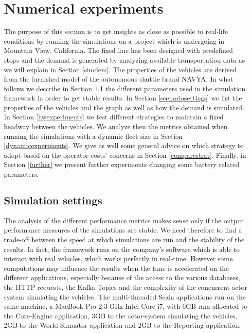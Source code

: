 \documentclass[12pt,a4paper]{article}
\begin{document}
\section{Numerical experiments}\label{experiments}
The purpose of this section is to get insights as close as possible to real-life conditions by running the simulations on a project which is undergoing in Mountain View, California. The fixed line has been designed with predefined stops and the demand is generated by analyzing available transportation data as we will explain in Section \ref{simdem}. The properties of the vehicles are derived from the furnished model of the autonomous shuttle brand NAVYA. In what follows we describe in Section \ref{settings} the different parameters used in the simulation framework in order to get stable results. In Section \ref{scenariosettings} we list the properties of the vehicles and the graph as well as how the demand is simulated. In Section \ref{hwexperiments} we test different strategies to maintain a fixed headway between the vehicles. We analyze then the metrics obtained when running the simulations with a dynamic fleet size in Section \ref{dynamicexperiments}. We give as well some general advice on which strategy to adopt based on the operator costs' concerns in Section \ref{comparestrat}. Finally, in Section \ref{further} we present further experiments changing some battery related parameters.

\subsection{Simulation settings}\label{settings}
The analysis of the different performance metrics makes sense only if the output performance measures of the simulations are stable. We need therefore to find a trade-off between the speed at which simulations are run and the stability of the results. In fact, the framework runs on the company's software which is able to interact with real vehicles, which works perfectly in real-time. However some computations may influence the results when the time is accelerated on the different applications, especially because of the access to the various databases, the HTTP requests, the Kafka Topics and the complexity of the concurrent actor system simulating the vehicles. The multi-threaded Scala applications run on the same machine, a MacBook Pro 2.3 GHz Intel Core i7, with 6GB ram allocated to the Core-Engine application, 3GB to the actor-system simulating the vehicles, 2GB to the World-Simuator application and 2GB to the Reporting application. 
\end{document}

